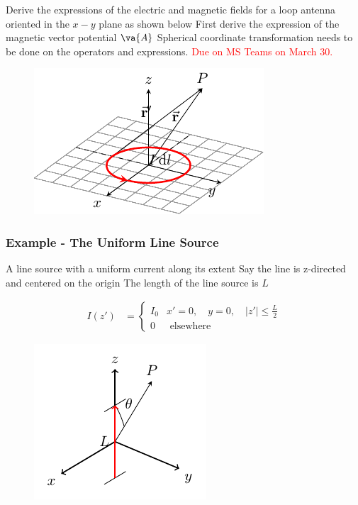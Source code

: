 \documentclass[10pt, compress]{beamer}
\begin{document}
\begin{frame}

  \begin{tcolorbox}[colback=blue!5,colframe=university-blue,title=Homework]
    \begin{outline}
      \1 Derive the expressions of the electric and magnetic fields for a loop antenna oriented in the $x-y$ plane as shown below
      \2 First derive the expression of the magnetic vector potential $\va{A}$
      \2 Spherical coordinate transformation needs to be done on the operators and expressions.
      \1 \textcolor{red}{Due on MS Teams on March 30.}
    \end{outline}
  \end{tcolorbox}
  \begin{figure}
    \centering
    \includegraphics[width=.4\textwidth]{circular.pdf}
  \end{figure}
\end{frame}

\begin{frame}
  \frametitle{Example - The Uniform Line Source}
  \begin{outline}
    \1 A line source with a uniform current along its extent
    \1 Say the line is z-directed and centered on the origin
    \1 The length of the line source is $L$
  \end{outline}
  \begin{align*}
    I (z') & =\left\{\begin{array}{ll}
      I_{0} & x'=0, \quad y=0, \quad |z'| \leq \frac{L}{2} \\
      0     & \text { elsewhere }
    \end{array}\right.
  \end{align*}
  \begin{figure}[t!]
    \centering
    \includegraphics[width=.4\textwidth]{line_source.pdf}
  \end{figure}
\end{frame}
\end{document}
